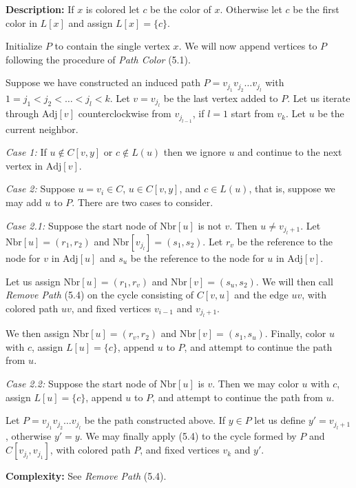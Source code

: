 \documentclass[letterpaper, 12pt]{article}
\theoremstyle{thm}
\begin{document}
\noindent\textbf{Description:} If $x$ is colored let $c$ be the color of $x$.
Otherwise let $c$ be the first color in $L[x]$ and assign
$L[x]=\{c\}$.

Initialize $P$ to contain the single vertex $x$. We will now
append vertices to $P$ following the procedure of \textit{Path Color} (5.1).

Suppose we have constructed an induced path $P=v_{j_1}v_{j_2}\ldots v_{j_l}$
with $1=j_1<j_2<\ldots<j_l< k$. Let $v=v_{j_l}$ be the last vertex added to $P$.
Let us iterate through $\text{Adj}[v]$ counterclockwise from $v_{j_{l-1}}$, if
$l=1$ start from $v_k$. Let $u$ be the current neighbor.

\textit{Case 1:} If $u\not\in C[v,y]$ or $c\not\in L(u)$ then we ignore $u$ and
continue to the next vertex in $\text{Adj}[v]$.

\textit{Case 2:} Suppose $u=v_i\in C$,
$u\in C[v,y]$, and $c\in L(u)$, that is, suppose we may add $u$ to $P$.
There are two cases to consider.

\textit{Case 2.1:} Suppose the start node of $\text{Nbr}[u]$ is not $v$. Then
$u\ne v_{j_l +1}$. Let $\text{Nbr}[u]=(r_1,r_2)$ and
$\text{Nbr}[v_{j_l}]=(s_1,s_2)$. Let $r_v$ be the reference to the node for
$v$ in $\text{Adj}[u]$ and $s_u$ be the reference to the node for $u$ in
$\text{Adj}[v]$.

Let us assign $\text{Nbr}[u]=(r_1,r_v)$ and $\text{Nbr}[v]=(s_u,s_2)$. We will
then call \textit{Remove Path} (5.4) on the cycle consisting of $C[v,u]$ and the
edge $uv$, with colored path $uv$, and fixed vertices $v_{i-1}$ and
$v_{j_l+1}$.

We then assign $\text{Nbr}[u]=(r_v,r_2)$ and $\text{Nbr}[v]=(s_1,s_u)$. Finally,
color $u$ with $c$, assign $L[u]=\{c\}$, append $u$ to $P$, and attempt to
continue the path from $u$.

\textit{Case 2.2:} Suppose the start node of $\text{Nbr}[u]$ is $v$. Then we may
color $u$ with $c$, assign $L[u]=\{c\}$, append $u$ to $P$, and attempt to
continue the path from $u$.

Let $P=v_{j_1}v_{j_2}\ldots v_{j_l}$ be the path constructed above.
If $y\in P$ let us define $y'=v_{j_l+1}$, otherwise $y'=y$.
We may finally apply  (5.4) to the cycle formed by $P$ and
$C[v_{j_l},v_{j_1}]$, with colored path $P$, and fixed
vertices $v_k$ and $y'$.

\noindent\textbf{Complexity:} See \textit{Remove Path} (5.4).\\
\end{document}
